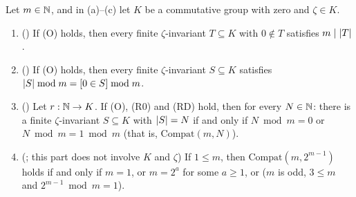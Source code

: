 \begin{theorem}\label{ec:thm:compat}
Let $m\in\mathbb N$, and in \textup{(a)}--\textup{(c)} let $K$ be a commutative group with zero and $\zeta\in K$.
\begin{enumerate}[label=(\alph*)]
\item \textup{()} If \textup{(O)} holds, then every finite $\zeta$-invariant $T\subseteq K$ with
  $0\notin T$ satisfies $m\mid\lvert T\rvert$.
\item \textup{()} If \textup{(O)} holds, then every finite $\zeta$-invariant $S\subseteq K$ satisfies
  $\lvert S\rvert\bmod m=[0\in S]\bmod m$.
\item \textup{()} Let $r:\mathbb N\to K$. If \textup{(O)}, \textup{(R0)} and \textup{(RD)} hold, then for
  every $N\in\mathbb N$: there is a finite $\zeta$-invariant $S\subseteq K$ with $\lvert S\rvert=N$ if and only if $N\bmod m=0$ or
  $N\bmod m=1\bmod m$ \textup{(}that is, $\mathrm{Compat}(m,N)$\textup{)}.
\item \textup{(; this part does not involve $K$ and $\zeta$)} If $1\le m$, then
  $\mathrm{Compat}(m,2^{m-1})$ holds if and only if $m=1$, or $m=2^a$ for some $a\ge1$, or \textup{(}$m$ is odd,
  $3\le m$ and $2^{m-1}\bmod m=1$\textup{)}.
\end{enumerate}
\end{theorem}

